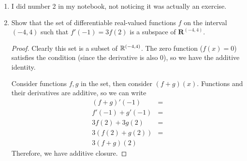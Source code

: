 \begin{enumerate}
\begin{enumerate}
        \begin{proof}
            Consider the element $(1, 0, 1)$ which is in our set because $1 + 2 \cdot 0 + 3 \cdot 1 = 4$ and it is in $\F^3$. Now consider multiplying it by the scalar 2 to create the element $(2, 0, 2)$. Unfortunately, $2 + 2\cdot 0 + 3 \cdot 2 = 8 \neq 4$, so this set does not fulfill the closure under scalar multiplication condition.
        \end{proof}

            \item $\{(x_1, x_2, x_3) \in \mathbb{F}^3 : x_1x_2x_3 = 0\}$
            
            \begin{proof}
                Consider the sets $(1, 1, 0)$ and $(0, 0, 1)$. Summing these up, we get $(1, 1, 1)$, but $1\cdot 1\cdot 1 = 1 \neq 0$, so this set fails the additive closure property.
            \end{proof}
            \item $\{(x_1, x_2, x_3) \in \mathbb{F}^3 : x_1 = 5x_3\}$
            
            I am too lazy but I did the other 3, good enough
    \end{enumerate}
    \item[2] I did number 2 in my notebook, not noticing it was actually an exercise.

    \item[3] Show that the set of differentiable real-valued functions $f$ on the interval
    $(-4, 4)$ such that $f'(-1) = 3f(2)$ is a subspace of $\mathbf{R}^{(-4,4)}$.

    \begin{proof}
        Clearly this set is a subset of $\mathbb{R}^{(-4, 4)}$. The zero function ($f(x) = 0$) satisfies the condition (since the derivative is also 0), so we have the additive identity. 

        Consider functions $f, g$ in the set, then consider $(f + g)(x)$. Functions and their derivatives are additive, so we can write 
        \begin{align*}
            (f + g)'(-1) &= \\
            f'(-1) + g'(-1) &= \\
            3f(2) + 3g(2) &= \\
            3(f(2) + g(2)) &= \\
            3(f + g)(2)
        \end{align*}
        Therefore, we have additive closure. 


\end{proof}
\end{enumerate}
